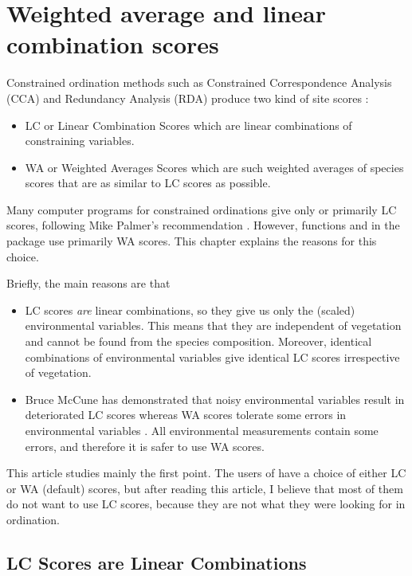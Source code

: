 \documentclass[article,nojss]{jss}
\renewcommand{\cite}{\citep}
\begin{document}
\section{Weighted average and linear combination scores}

Constrained ordination methods such as Constrained Correspondence
Analysis (CCA) and Redundancy Analysis (RDA) produce two kind of site
scores \cite{Braak86, Palmer93}:
\begin{itemize}
\item
LC or Linear Combination Scores which are linear combinations of
constraining variables.
\item
WA or Weighted Averages Scores which are such weighted averages of
species scores that are as similar to LC scores as possible.
\end{itemize}
Many computer programs for constrained ordinations give only or
primarily LC scores, following Mike Palmer's recommendation
\cite{Palmer93}.  However, functions  and  in
the  package use primarily WA scores. This chapter
explains the reasons for this choice.

Briefly, the main reasons are that
\begin{itemize}
\item
LC scores \emph{are} linear combinations, so they give us only the
(scaled) environmental variables. This means that they are
independent of vegetation and cannot be found from the species
composition.  Moreover, identical combinations of environmental
variables give identical LC scores irrespective of vegetation.
\item
Bruce McCune has demonstrated that noisy environmental variables
result in deteriorated LC scores whereas WA scores tolerate some errors
in environmental variables \cite{McCune97}.  All environmental
measurements contain some errors, and therefore it is safer to use WA
scores.
\end{itemize}
This article studies mainly the first point.  The users of
 have a choice of either LC or WA (default) scores, but
after reading this article, I believe that most of them do not want to
use LC scores, because they are not what they were looking for in
ordination.

\subsection{LC Scores are Linear Combinations}
\end{document}
